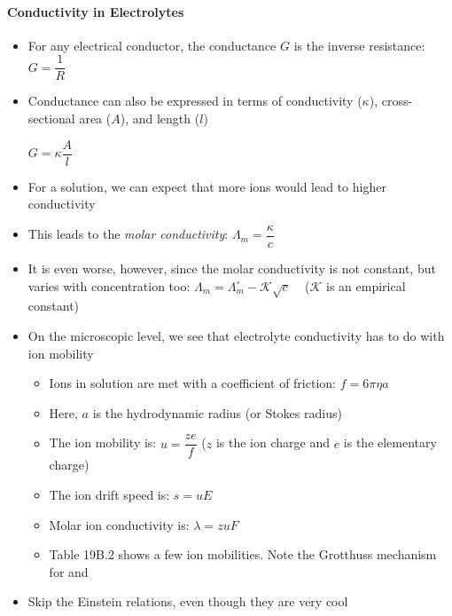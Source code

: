 \documentclass[12pt, openany, letterpaper]{memoir}
\begin{document}
\paragraph*{Conductivity in Electrolytes}
\begin{itemize}
	\item For any electrical conductor, the conductance $G$ is the inverse resistance: $G=\dfrac{1}{R}$
	\item Conductance can also be expressed in terms of conductivity ($\kappa$), cross-sectional area ($A$), and length ($l$)
	
	$G=\kappa\dfrac{A}{l}$
	\item For a solution, we can expect that more ions would lead to higher conductivity
	\item This leads to the \emph{molar conductivity}: $\Lambda_m=\dfrac{\kappa}{c}$
	\item It is even worse, however, since the molar conductivity is not constant, but varies with concentration too: $\Lambda_m = \Lambda_m^\circ-\mathcal{K}\sqrt{c}$ ~ ($\mathcal{K}$ is an empirical constant)
	\item On the microscopic level, we see that electrolyte conductivity has to do with ion mobility
	\begin{itemize}
		\item Ions in solution are met with a coefficient of friction: $f=6\pi\eta a$
		\item Here, $a$ is the hydrodynamic radius (or Stokes radius)
		\item The ion mobility is: $u = \dfrac{ze}{f}$ ($z$ is the ion charge and $e$ is the elementary charge)
		\item The ion drift speed is: $s = uE$
		\item Molar ion conductivity is: $\lambda=zuF$
		\item Table 19B.2 shows a few ion mobilities. Note the Grotthuss mechanism for  and 
	\end{itemize}
	\item Skip the Einstein relations, even though they are very cool
\end{itemize}
\end{document}
